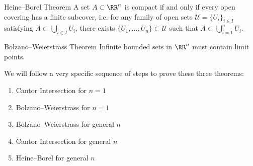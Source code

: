 \begin{thrm}{Heine--Borel Theorem}{}
A set $A\subset\RR^n$ is compact if and only if every open covering has a finite subcover, i.e. for any family of open sets $\mathscr{U}=\{U_i\}_{i\in I}$ satisfying $A\subset\bigcup_{i\in I}U_i$, there exists $\{U_1,\dots,U_n\}\subset\mathscr{U}$ such that $A\subset\bigcup_{i=1}^n U_i$.
\end{thrm}

\begin{thrm}{Bolzano--Weierstrass Theorem}{}
Infinite bounded sets in $\RR^n$ must contain limit points.
\end{thrm}

We will follow a very specific sequence of steps to prove these three theorems:
\begin{enumerate}[label=(\alph*)]
\item Cantor Intersection for $n=1$
\item Bolzano--Weierstrass for $n=1$
\item Bolzano--Weierstrass for general $n$
\item Cantor Intersection for general $n$
\item Heine--Borel for general $n$
\end{enumerate}

